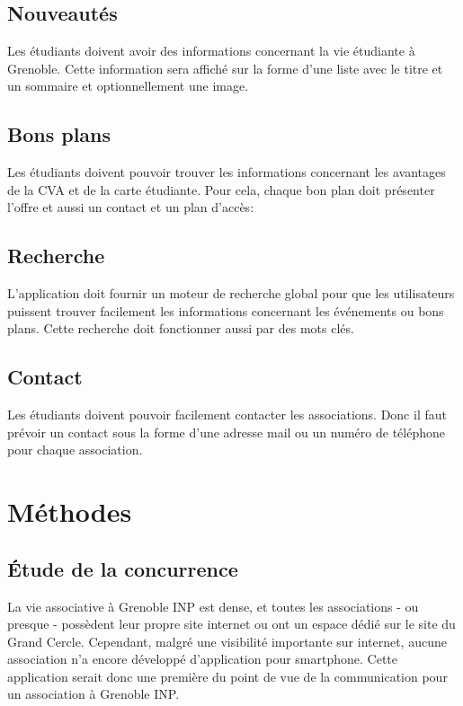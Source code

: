 \documentclass[a4paper, 11px]{article}
\begin{document}
\subsection{Nouveautés}

Les étudiants doivent avoir des informations concernant la vie étudiante à Grenoble. Cette information sera affiché sur la forme d'une liste avec le titre et un sommaire et optionnellement une image.

\subsection{Bons plans}

Les étudiants doivent pouvoir trouver les informations concernant les avantages de la CVA et de la carte étudiante. Pour cela, chaque bon plan doit présenter l'offre et aussi un contact et un plan d'accès:

\subsection{Recherche}

L'application doit fournir un moteur de recherche global pour que les utilisateurs puissent trouver facilement les informations concernant les événements ou bons plans. Cette recherche doit fonctionner aussi par des mots clés.

\subsection{Contact}

Les étudiants doivent pouvoir facilement contacter les associations. Donc il faut prévoir un contact sous la forme d'une adresse mail ou un numéro de téléphone pour chaque association.

\newpage

\section{Méthodes}

\subsection{Étude de la concurrence}
La vie associative à Grenoble INP est dense, et toutes les associations - ou presque - possèdent leur propre site internet ou ont un espace dédié sur le site du Grand Cercle.
Cependant, malgré une visibilité importante sur internet, aucune association n'a encore développé d'application pour smartphone. Cette application serait donc une première du point de vue de la communication pour un association à Grenoble INP.
\end{document}
